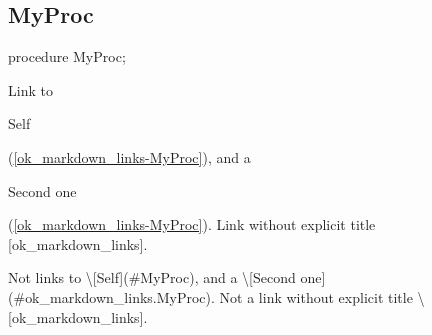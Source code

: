 \documentclass{report}
\begin{document}
\subsection*{MyProc}
\begin{list}{}{
\setlength{\itemindent}{0cm}
\setlength{\listparindent}{0cm}
\setlength{\leftmargin}{\evensidemargin}
\addtolength{\leftmargin}{\tmplength}
\settowidth{\labelsep}{X}
\addtolength{\leftmargin}{\labelsep}
\setlength{\labelwidth}{\tmplength}
}
\begin{flushleft}
\item[\textbf{Declaration}\hfill]
\begin{ttfamily}
procedure MyProc;\end{ttfamily}


\end{flushleft}
\par
\item[\textbf{Description}]
Link to \begin{ttfamily}Self\end{ttfamily}(\ref{ok_markdown_links-MyProc}), and a \begin{ttfamily}Second one\end{ttfamily}(\ref{ok_markdown_links-MyProc}). Link without explicit title [ok{\_}markdown{\_}links].

Not links to {\textbackslash}[Self]({\#}MyProc), and a {\textbackslash}[Second one]({\#}ok{\_}markdown{\_}links.MyProc). Not a link without explicit title {\textbackslash}[ok{\_}markdown{\_}links].

\end{list}
\end{document}
